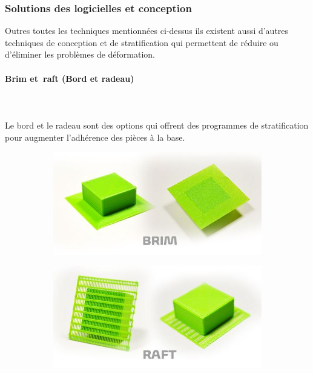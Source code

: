 \documentclass[11pt,a4paper]{article}
\begin{document}
		\subsubsection{Solutions des logicielles et conception}Outres toutes les techniques mentionnées ci-dessus ils existent aussi d’autres techniques de conception et de stratification qui permettent de réduire ou d’éliminer les problèmes de déformation.
			\paragraph{Brim et raft (Bord et radeau)}\mbox{}\\\\
Le bord et le radeau sont des options qui offrent des programmes de stratification pour augmenter l’adhérence des pièces à la base.
\begin{figure}[H]
    \centering
    \begin{subfigure}[b]{0.4\textwidth}
        \includegraphics[width=\textwidth,cfbox=azul_marcos 4pt 0pt]{FOTOS/BRIM}
    \end{subfigure}
    \qquad %
    \begin{subfigure}[b]{0.4\textwidth}
        \includegraphics[width=\textwidth,cfbox=azul_marcos 4pt 0pt]{FOTOS/RAFT}
    \end{subfigure}   
\end{figure}
\end{document}
